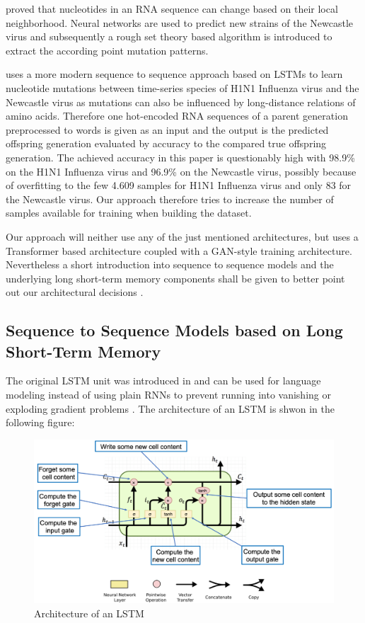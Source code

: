 \cite{Salama2016} proved that nucleotides in an RNA sequence can change based on their local neighborhood. Neural networks are used to predict new strains of the Newcastle virus and subsequently a rough set theory based algorithm is introduced to extract the according point mutation patterns. 

\cite{Mohamed2021} uses a more modern sequence to sequence approach based on \acp{LSTM} to learn nucleotide mutations between time-series species of H1N1 Influenza virus and the Newcastle virus as mutations can also be influenced by long-distance relations of amino acids. Therefore one hot-encoded RNA sequences of a parent generation preprocessed to words is given as an input and the output is the predicted offspring generation evaluated by accuracy to the compared true offspring generation. The achieved accuracy in this paper is questionably high with 98.9\% on the H1N1 Influenza virus and 96.9\% on the Newcastle virus, possibly because of overfitting to the few 4.609 samples for H1N1 Influenza virus and only 83 for the Newcastle virus. Our approach therefore tries to increase the number of samples available for training when building the dataset. 

Our approach will neither use any of the just mentioned architectures, but uses a Transformer based architecture coupled with a GAN-style training architecture. Nevertheless a short introduction into sequence to sequence models and the underlying long short-term memory components shall be given to better point out our architectural decisions . 

\subsection{Sequence to Sequence Models based on Long Short-Term Memory} \label{fundamentalsE}


The original \ac{LSTM} unit was introduced in \cite{Hochreiter1997} and can be used for language modeling instead of using plain \acp{RNN} to prevent running into vanishing or exploding gradient problems \cite{Sundermeyer2012}. The architecture of an \ac{LSTM} is shwon in the following figure:

\begin{figure}[ht]
	\centering
	\includegraphics[width=0.8\linewidth]{figures/lstm_architecture.png}
	\caption{Architecture of an \ac{LSTM} \cite{Gertz2020}}
	\label{lstm_architecture}
\end{figure}

